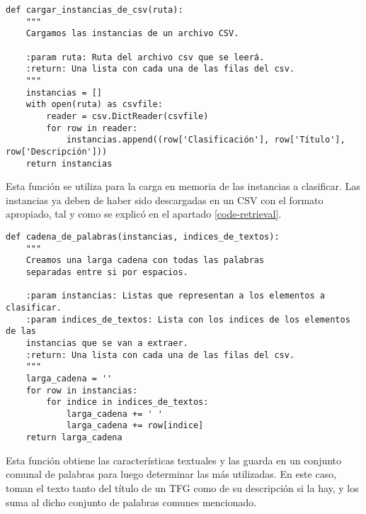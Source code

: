 \lhead{\emph{\ChapterTwo{}}}
\lstset{
   language=Python
}

\begin{center}
\begin{minipage}{\linewidth}
\begin{lstlisting}[caption=Función para cargar instancias de un archivo CSV.]
def cargar_instancias_de_csv(ruta):
    """
    Cargamos las instancias de un archivo CSV.

    :param ruta: Ruta del archivo csv que se leerá.
    :return: Una lista con cada una de las filas del csv.
    """
    instancias = []
    with open(ruta) as csvfile:
        reader = csv.DictReader(csvfile)
        for row in reader:
            instancias.append((row['Clasificación'], row['Título'], row['Descripción']))
    return instancias
\end{lstlisting}
\end{minipage}
\end{center}

Esta función se utiliza para la carga en memoria de las instancias a clasificar.%
%
Las instancias ya deben de haber sido descargadas en un CSV con el formato apropiado, tal y como se explicó en el apartado \ref{code-retrieval}.

\begin{center}
\begin{minipage}{\linewidth}
\begin{lstlisting}[caption=Función que recopila un conjunto de palabras comunes]
def cadena_de_palabras(instancias, indices_de_textos):
    """
    Creamos una larga cadena con todas las palabras
    separadas entre si por espacios.

    :param instancias: Listas que representan a los elementos a clasificar.
    :param indices_de_textos: Lista con los indices de los elementos de las
    instancias que se van a extraer.
    :return: Una lista con cada una de las filas del csv.
    """
    larga_cadena = ''
    for row in instancias:
        for indice in indices_de_textos:
            larga_cadena += ' '
            larga_cadena += row[indice]
    return larga_cadena
\end{lstlisting}
\end{minipage}
\end{center}

Esta función obtiene las características textuales y las guarda en un conjunto comunal de palabras para luego determinar las más utilizadas.
%
En este caso, toman el texto tanto del título de un TFG como de su descripción si la hay, y los suma al dicho conjunto de palabras comunes mencionado.

